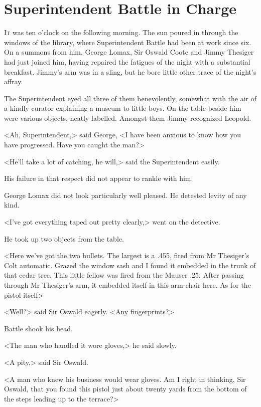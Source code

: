 \chapter{Superintendent Battle in Charge}

\lettrine{I}{t} was ten o'clock on the following morning. The sun poured in through the windows of the library, where Superintendent Battle had been at work since six. On a summons from him, George Lomax, Sir Oswald Coote and Jimmy Thesiger had just joined him, having repaired the fatigues of the night with a substantial breakfast. Jimmy's arm was in a sling, but he bore little other trace of the night's affray.

The Superintendent eyed all three of them benevolently, somewhat with the air of a kindly curator explaining a museum to little boys. On the table beside him were various objects, neatly labelled. Amongst them Jimmy recognized Leopold.

<Ah, Superintendent,> said George, <I have been anxious to know how you have progressed. Have you caught the man?>

<He'll take a lot of catching, he will,> said the Superintendent easily.

His failure in that respect did not appear to rankle with him.

George Lomax did not look particularly well pleased. He detested levity of any kind.

<I've got everything taped out pretty clearly,> went on the detective.

He took up two objects from the table.

<Here we've got the two bullets. The largest is a .455, fired from Mr Thesiger's Colt automatic. Grazed the window sash and I found it embedded in the trunk of that cedar tree. This little fellow was fired from the Mauser .25. After passing through Mr Thesiger's arm, it embedded itself in this arm-chair here. As for the pistol itself\longdash>

<Well?> said Sir Oswald eagerly. <Any fingerprints?>

Battle shook his head.

<The man who handled it wore gloves,> he said slowly.

<A pity,> said Sir Oswald.

<A man who knew his business would wear gloves. Am I right in thinking, Sir Oswald, that you found this pistol just about twenty yards from the bottom of the steps leading up to the terrace?>

